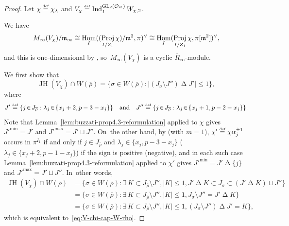 \documentclass[JEP,XML,SOM,Unicode,NoFloatCountersInSection, NoEqCountersInSection,published]{cedram}
\newcommand{\quand}{\quad\text{and}\quad}
\let\ovl\overline
\newcommand{\defeq}{\stackrel{\textrm{\tiny{\upshape{def}}}}{=}}
\newcommand{\cO}{\mathcal{O}}
\newcommand{\brho}{\overline{\rho}}
\DeclareMathOperator{\GL}{GL}
\DeclareMathOperator{\Hom}{Hom}
\DeclareMathOperator{\Ind}{Ind}
\DeclareMathOperator{\JH}{\mathrm{JH}}
\DeclareMathOperator{\Proj}{Proj}
\theoremstyle{plain}
\theoremstyle{definition}
\begin{document}
\begin{proof}
Let $\chi \defeq \chi_\lambda$ and $V_\chi \defeq \Ind_I^{\GL_2(\cO_K)} W_{\chi,2}$.

We have
\begin{equation}\label{eq:M_infty-V_chi}
M_\infty(V_\chi) / \m_\infty \cong \Hom_I((\Proj_{I/Z_1} \chi)/\m^2,\pi)^\vee \cong \Hom_I(\Proj_{I/Z_1} \chi,\pi[\m^2])^\vee,
\end{equation}
and this is one-dimensional by \cite[Th.\,1.3(ii)]{HuWang2}, so~$M_\infty(V_\chi)$ is a cyclic $\ovl R_\infty$-module.

We first show that
\begin{equation}\label{eq:V-chi-cap-W-rho}
\JH(V_{\chi}) \cap W(\brho) = \bigl\{ \sigma \in W(\brho): \big\lvert (J_\sigma \setminus J'') \mathbin\Delta J'\big\rvert \le 1 \bigr\},
\end{equation}
where
\[
J' \defeq \{ j \!\in\! J_{\brho}: \lambda_j \!\in\! \{x_j+2,p-3-x_j\}\}\quand J'' \defeq \{ j \!\in\! J_{\brho}: \lambda_j \!\in\! \{x_j+1,p-2-x_j\}\}.
\]
Note that Lemma~\ref{lem:buzzati-prop4.3-reformulation} applied to $\chi$ gives $J'^\min = J'$ and $J'^\max = J' \sqcup J''$. On~the other hand, by \cite[Lem.\,2.3.6(ii)]{BHHMS4} (with $m=1$), $\chi' \defeq \chi \alpha_j^{\pm 1}$ occurs in $\pi^{I_1}$ if and only if $j \in J_{\brho}$ and $\lambda_j \in \{x_j,p-3-x_j\}$ (\resp $\lambda_j \in \{x_j+2,p-1-x_j\}$) if the sign is positive (\resp negative), and in each such case Lemma~\ref{lem:buzzati-prop4.3-reformulation} applied to $\chi'$ gives $J'^\min = J' \mathbin\Delta \{j\}$ and $J'^\max = J' \sqcup J''$. In~other words,
\begin{align*}
\JH(V_{\chi}) \cap W(\brho) &= \big\{ \sigma \!\in\! W(\brho): \exists \ K \!\subset\! J_{\brho}\setminus J'', |K| \le 1, J' \mathbin\Delta K \!\subset\! J_\sigma \!\subset\! (J' \mathbin\Delta K) \sqcup J''\big\} \\
&= \big\{ \sigma \!\in\! W(\brho): \exists \ K \!\subset\! J_{\brho}\setminus J'', |K| \le 1, J_\sigma \setminus J'' = J' \mathbin\Delta K \big\} \\
&= \big\{ \sigma \!\in\! W(\brho): \exists \ K \!\subset\! J_{\brho}\setminus J'', |K| \le 1, (J_\sigma \setminus J'') \mathbin\Delta J' = K \big\},
\end{align*}
which is equivalent to~\eqref{eq:V-chi-cap-W-rho}.


\end{proof}
\end{document}

